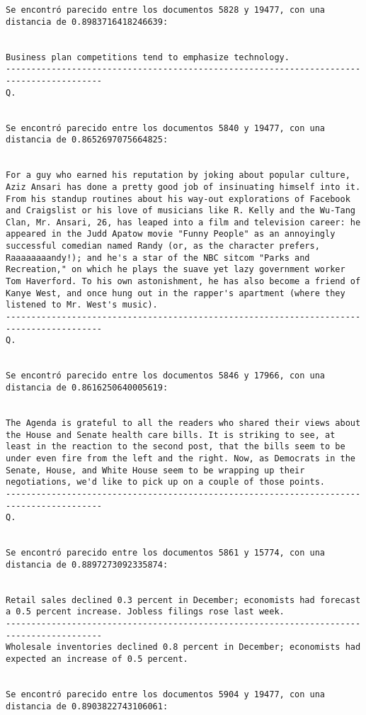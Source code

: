 \documentclass[11pt]{article}
\begin{document}
\begin{Verbatim}[commandchars=\\\{\}]
Se encontró parecido entre los documentos 5828 y 19477, con una distancia de 0.8983716418246639:


Business plan competitions tend to emphasize technology.
-----------------------------------------------------------------------------------------
Q.


Se encontró parecido entre los documentos 5840 y 19477, con una distancia de 0.8652697075664825:


For a guy who earned his reputation by joking about popular culture, Aziz Ansari has done a pretty good job of insinuating himself into it. From his standup routines about his way-out explorations of Facebook and Craigslist or his love of musicians like R. Kelly and the Wu-Tang Clan, Mr. Ansari, 26, has leaped into a film and television career: he appeared in the Judd Apatow movie "Funny People" as an annoyingly successful comedian named Randy (or, as the character prefers, Raaaaaaaandy!); and he's a star of the NBC sitcom "Parks and Recreation," on which he plays the suave yet lazy government worker Tom Haverford. To his own astonishment, he has also become a friend of Kanye West, and once hung out in the rapper's apartment (where they listened to Mr. West's music).
-----------------------------------------------------------------------------------------
Q.


Se encontró parecido entre los documentos 5846 y 17966, con una distancia de 0.8616250640005619:


The Agenda is grateful to all the readers who shared their views about the House and Senate health care bills. It is striking to see, at least in the reaction to the second post, that the bills seem to be under even fire from the left and the right. Now, as Democrats in the Senate, House, and White House seem to be wrapping up their negotiations, we'd like to pick up on a couple of those points.
-----------------------------------------------------------------------------------------
Q.


Se encontró parecido entre los documentos 5861 y 15774, con una distancia de 0.8897273092335874:


Retail sales declined 0.3 percent in December; economists had forecast a 0.5 percent increase. Jobless filings rose last week.
-----------------------------------------------------------------------------------------
Wholesale inventories declined 0.8 percent in December; economists had expected an increase of 0.5 percent.


Se encontró parecido entre los documentos 5904 y 19477, con una distancia de 0.8903822743106061:



\end{Verbatim}
\end{document}
